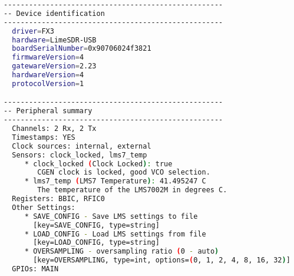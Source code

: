 \begin{appendices}
\begin{lstlisting}[language=bash, caption={SoapySDRUtil Probe Output for LimeSDR}, label={lst: soapyProbe}]
----------------------------------------------------
-- Device identification
----------------------------------------------------
  driver=FX3
  hardware=LimeSDR-USB
  boardSerialNumber=0x90706024f3821
  firmwareVersion=4
  gatewareVersion=2.23
  hardwareVersion=4
  protocolVersion=1

----------------------------------------------------
-- Peripheral summary
----------------------------------------------------
  Channels: 2 Rx, 2 Tx
  Timestamps: YES
  Clock sources: internal, external
  Sensors: clock_locked, lms7_temp
     * clock_locked (Clock Locked): true
        CGEN clock is locked, good VCO selection.
     * lms7_temp (LMS7 Temperature): 41.495247 C
        The temperature of the LMS7002M in degrees C.
  Registers: BBIC, RFIC0
  Other Settings:
     * SAVE_CONFIG - Save LMS settings to file
       [key=SAVE_CONFIG, type=string]
     * LOAD_CONFIG - Load LMS settings from file
       [key=LOAD_CONFIG, type=string]
     * OVERSAMPLING - oversampling ratio (0 - auto)
       [key=OVERSAMPLING, type=int, options=(0, 1, 2, 4, 8, 16, 32)]
  GPIOs: MAIN


\end{lstlisting}
\end{appendices}
